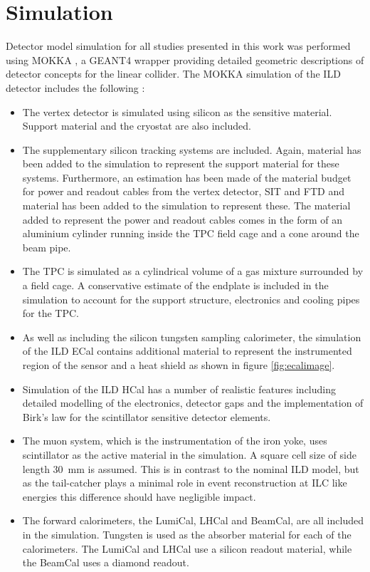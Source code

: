 \section{Simulation}
\label{sec:simulation}
Detector model simulation for all studies presented in this work was performed using MOKKA \cite{MoradeFreitas:2002kj}, a GEANT4 \cite{Agostinelli:2002hh,Allison:2006ve} wrapper providing detailed geometric descriptions of detector concepts for the linear collider.  The MOKKA simulation of the ILD detector includes the following \cite{Behnke:2013lya}:
\begin{itemize}
\item The vertex detector is simulated using silicon as the sensitive material.  Support material and the cryostat are also included.
\item The supplementary silicon tracking systems are included.  Again, material has been added to the simulation to represent the support material for these systems.  Furthermore, an estimation has been made of the material budget for power and readout cables from the vertex detector, SIT and FTD and material has been added to the simulation to represent these.  The material added to represent the power and readout cables comes in the form of an aluminium cylinder running inside the TPC field cage and a cone around the beam pipe.
\item The TPC is simulated as a cylindrical volume of a gas mixture surrounded by a field cage.  A conservative estimate of the endplate is included in the simulation to account for the support structure, electronics and cooling pipes for the TPC.
\item As well as including the silicon tungsten sampling calorimeter, the simulation of the ILD ECal contains additional material to represent the instrumented region of the sensor and a heat shield as shown in figure \ref{fig:ecalimage}.
\item Simulation of the ILD HCal has a number of realistic features including detailed modelling of the electronics, detector gaps and the implementation of Birk's law \cite{Birks:1951boa} for the scintillator sensitive detector elements.
\item The muon system, which is the instrumentation of the iron yoke, uses scintillator as the active material in the simulation.  A square cell size of side length 30~mm is assumed.  This is in contrast to the nominal ILD model, but as the tail-catcher plays a minimal role in event reconstruction at ILC like energies this difference should have negligible impact.  
\item The forward calorimeters, the LumiCal, LHCal and BeamCal, are all included in the simulation.  Tungsten is used as the absorber material for each of the calorimeters.  The LumiCal and LHCal use a silicon readout material, while the BeamCal uses a diamond readout.  
\end{itemize}

